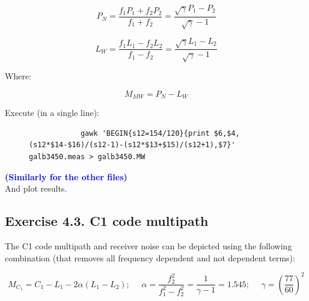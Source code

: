 \begin{equation}\label{Pcode_Wübbena}
P_{N} = \frac{f_{1}P_{1}+f_{2}P_{2}}{f_{1}+f_{2}}
=
\frac{\sqrt{\gamma} P_{1}-P_{2}}{\sqrt{\gamma} - 1}
\end{equation}

\begin{equation}\label{Carrier_Wübbena}
L_{W} = \frac{f_{1}L_{1}-f_{2}L_{2}}{f_{1}-f_{2}}
=
\frac{\sqrt{\gamma} L_{1}-L_{2}}{\sqrt{\gamma} - 1}
\end{equation}

Where:

\begin{equation}\label{Pcode_Wübbena}
M_{MW} = P_{N}-L_{W}
\end{equation}


Execute (in a single line):\\

\begin{figure}[H]
            \centering
            \begin{verbatim}
            gawk 'BEGIN{s12=154/120}{print $6,$4,(s12*$14-$16)/(s12-1)-(s12*$13+$15)/(s12+1),$7}' galb3450.meas > galb3450.MW
            \end{verbatim}
            \caption{}
            \label{}
\end{figure}


\textbf{\textcolor{Blue}{(Similarly for the other files)}}\\

And plot results.





\subsection{Exercise 4.3. C1 code multipath}
The C1 code multipath and receiver noise can be depicted using the following combination (that removes all frequency dependent and not dependent terms):

\begin{equation}\label{}
M_{C_{1}} =C_{1}-L_{1}-2\alpha\left(L_{1}-L_{2}\right) ; \ \ \ \ \ \ \alpha = \frac{f_{2}^{2}}{f_{1}^{2}-f_{2}^{2}} = \frac{1}{\gamma -1} = 1.545 ; \ \ \ \ \ \ \gamma = \left(\frac{77}{60}\right)^{2}
\end{equation}


